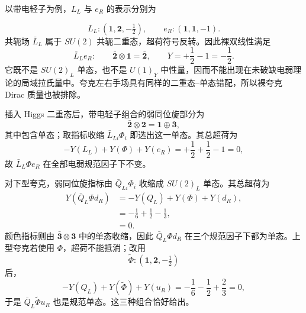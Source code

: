\begin{derivation}
以带电轻子为例，$L_L$ 与 $e_R$ 的表示分别为

\begin{equation*}
 L_L:(\mathbf1,\mathbf2,-\tfrac12),
 \qquad
 e_R:(\mathbf1,\mathbf1,-1).
\end{equation*}
共轭场 $\bar L_L$ 属于 $SU(2)$ 共轭二重态，超荷符号反转。因此裸双线性满足
\begin{equation*}
 \bar L_L e_R:
 \qquad
 \bar{\mathbf2}\otimes\mathbf1=\bar{\mathbf2},
 \qquad
 Y=+\frac12-1=-\frac12.
\end{equation*}
它既不是 $SU(2)_L$ 单态，也不是 $U(1)_Y$ 中性量，因而不能出现在未破缺电弱理论的局域拉氏量中。夸克左右手场具有同样的二重态--单态错配，所以裸夸克 Dirac 质量也被排除。

插入 Higgs 二重态后，带电轻子组合的弱同位旋部分为
\begin{equation*}
 \bar{\mathbf2}\otimes\mathbf2
 =\mathbf1\oplus\mathbf3,
\end{equation*}
其中包含单态；取指标收缩 $\bar L_{Li}\Phi_i$ 即选出这一单态。其总超荷为
\begin{equation*}
 -Y(L_L)+Y(\Phi)+Y(e_R)
 =+\frac12+\frac12-1=0,
\end{equation*}
故 $\bar L_L\Phi e_R$ 在全部电弱规范因子下不变。

对下型夸克，弱同位旋指标由 $\bar Q_{Li}\Phi_i$ 收缩成 $SU(2)_L$ 单态。其总超荷为
\begin{align*}
 Y(\bar Q_L\Phi d_R)
 &=-Y(Q_L)+Y(\Phi)+Y(d_R),\\
 &=-\frac16+\frac12-\frac13,\\
 &=0.
\end{align*}
颜色指标则由 $\bar{\mathbf3}\otimes\mathbf3$ 中的单态收缩，因此 $\bar Q_L\Phi d_R$ 在三个规范因子下都为单态。上型夸克若使用 $\Phi$，超荷不能抵消；改用
\begin{equation*}
 \widetilde\Phi:(\mathbf1,\mathbf2,-\tfrac12)
\end{equation*}
后，
\begin{equation*}
 -Y(Q_L)+Y(\widetilde\Phi)+Y(u_R)
 =-\frac16-\frac12+\frac23=0,
\end{equation*}
于是 $\bar Q_L\widetilde\Phi u_R$ 也是规范单态。这三种组合恰好给出。
\end{derivation}

